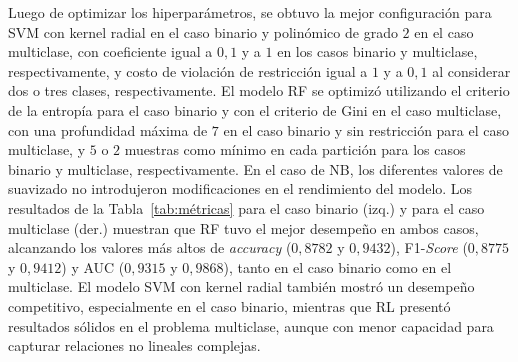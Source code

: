 \documentclass{llncs}
\begin{document}
Luego de optimizar los hiperparámetros, se obtuvo la mejor configuración para SVM con kernel radial en el caso binario y polinómico de grado $2$ en el caso multiclase, con coeficiente igual a $0,1$ y a $1$ en los casos binario y multiclase, respectivamente, y costo de violación de restricción igual a $1$ y a $0,1$ al considerar dos o tres clases, respectivamente. El modelo RF se optimizó utilizando el criterio de la entropía para el caso binario y con el criterio de Gini en el caso multiclase, con una profundidad máxima de $7$ en el caso binario y sin restricción para el caso multiclase, y $5$ o $2$ muestras como mínimo en cada partición para los casos binario y multiclase, respectivamente. En el caso de NB, los diferentes valores de suavizado no introdujeron modificaciones en el rendimiento del modelo.
Los resultados de la Tabla~\ref{tab:métricas} para el caso binario (izq.) y para el caso multiclase (der.) muestran que RF tuvo el mejor desempeño en ambos casos, alcanzando los valores más altos de \emph{accuracy} ($0,8782$ y $0,9432$), F1-\emph{Score} ($0,8775$ y $0,9412$) y AUC ($0,9315$ y $0,9868$), tanto en el caso binario como en el multiclase. El modelo SVM con kernel radial también mostró un desempeño competitivo, especialmente en el caso binario, mientras que RL presentó resultados sólidos en el problema multiclase, aunque con menor capacidad para capturar relaciones no lineales complejas. 

\begin{table}[htbp]
\centering
\caption{Métricas de evaluación en los casos binario (izq.) y multiclase (der.). }\label{tab:métricas}
\end{table}
\end{document}
